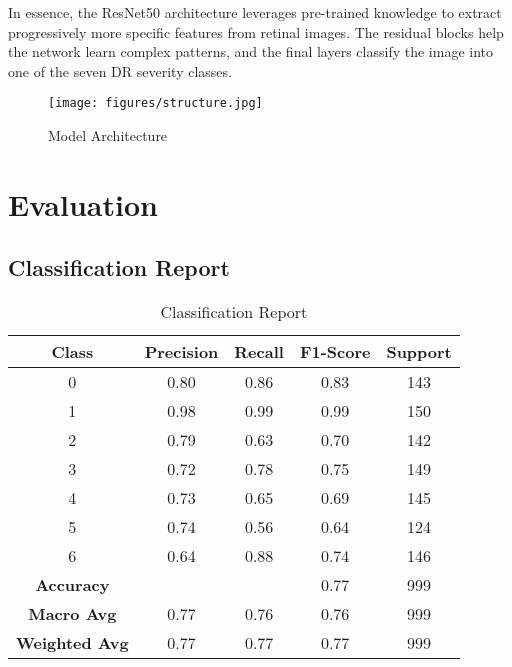 \documentclass[conference]{IEEEtran}
\begin{document}
In essence, the ResNet50 architecture leverages pre-trained knowledge to extract progressively more specific features from retinal images. The residual blocks help the network learn complex patterns, and the final layers classify the image into one of the seven DR severity classes. \\

\begin{figure}[h]
\centering
\texttt{[image: figures/structure.jpg]}
\caption{Model Architecture}
\end{figure}

\section{\textbf{Evaluation}}

\subsection{Classification Report}

\begin{table}[h]
\centering
\caption{Classification Report} 
\vspace{10pt}
\label{tab:classification_report}
\begin{tabular}{|c|c|c|c|c|}
\hline
\textbf{Class} & \textbf{Precision} & \textbf{Recall} & \textbf{F1-Score} & \textbf{Support} \\
\hline
0 & 0.80 & 0.86 & 0.83 & 143 \\
1 & 0.98 & 0.99 & 0.99 & 150 \\
2 & 0.79 & 0.63 & 0.70 & 142 \\
3 & 0.72 & 0.78 & 0.75 & 149 \\
4 & 0.73 & 0.65 & 0.69 & 145 \\
5 & 0.74 & 0.56 & 0.64 & 124 \\
6 & 0.64 & 0.88 & 0.74 & 146 \\
\hline
\textbf{Accuracy} & & & 0.77 & 999 \\
\textbf{Macro Avg} & 0.77 & 0.76 & 0.76 & 999 \\
\textbf{Weighted Avg} & 0.77 & 0.77 & 0.77 & 999 \\
\hline
\end{tabular}

\end{table}
\end{document}
